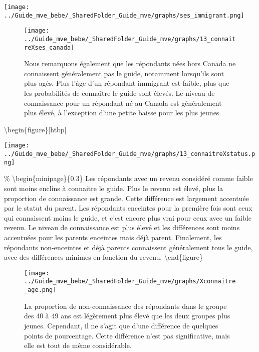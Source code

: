 \documentclass[
]{article}
\begin{document}
\texttt{[image: ../Guide\_mve\_bebe/\_SharedFolder\_Guide\_mve/graphs/ses\_immigrant.png]}

\begin{figure}[htbp]
  \centering
  \begin{minipage}{0.7\textwidth}
    \texttt{[image: ../Guide\_mve\_bebe/\_SharedFolder\_Guide\_mve/graphs/13\_connaitreXses\_canada]}
  \end{minipage}%
  \begin{minipage}{0.3\textwidth}
    \textbf{}Nous remarquons également que les répondants nées hors Canada ne connaissent généralement pas le guide, notamment lorsqu'ils sont plus agés. Plus l'âge d'un répondant immigrant est faible, plus que les probabilités de connaître le guide sont élevés. Le niveau de connaissance pour un répondant né au Canada est généralement plus élevé, à l'exception d'une petite baisse pour les plus jeunes.

  \end{minipage}
\end{figure}

\textbackslash begin\{figure\}{[}htbp{]} \centering

\begin{minipage}{0.7\textwidth}
    \texttt{[image: ../Guide\_mve\_bebe/\_SharedFolder\_Guide\_mve/graphs/13\_connaitreXstatus.png]}
  \end{minipage}

\% \textbackslash begin\{minipage\}\{0.3\textwidth\} \textbf{} Les
répondants avec un revenu considéré comme faible sont moins enclins à
connaitre le guide. Plus le revenu est élevé, plus la proportion de
connaissance est grande. Cette différence est largement accentuée par le
statut du parent. Les répondants enceintes pour la première fois sont
ceux qui connaissent moins le guide, et c'est encore plus vrai pour ceux
avec un faible revenu. Le niveau de connaissance est plus élevé et les
différences sont moins accentuées pour les parents enceintes mais déjà
parent. Finalement, les répondants non-enceintes et déjà parents
connaissent généralement tous le guide, avec des différences minimes en
fonction du revenu. \textbackslash end\{figure\}

\begin{figure}[htbp]
  \centering
  \begin{minipage}{0.7\textwidth}
    \texttt{[image: ../Guide\_mve\_bebe/\_SharedFolder\_Guide\_mve/graphs/Xconnaitre\_age.png]}
  \end{minipage}%
  \begin{minipage}{0.3\textwidth}
    \textbf{} La proportion de non-connaissance des répondants dans le groupe des 40 à 49 ans est légèrement plus élevé que les deux groupes plus jeunes. Cependant, il ne s'agit que d'une différence de quelques points de pourcentage. Cette différence n'est pas significative, mais elle est tout de même considérable.
  \end{minipage}
\end{figure}
\end{document}
